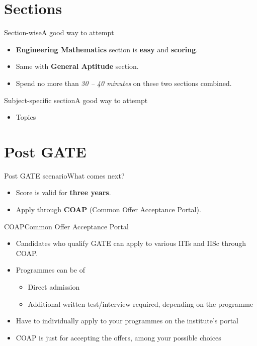 \documentclass[handout]{beamer}
\begin{document}
\section{Sections}
\begin{frame}{Section-wise}{A good way to attempt}
    \begin{itemize}
        \item \textbf{Engineering Mathematics} section is \textbf{easy} and \textbf{scoring}.
        \item Same with \textbf{General Aptitude} section.
        \item Spend no more than \emph{30 -- 40 minutes} on these two sections combined.
    \end{itemize}
\end{frame}

\begin{frame}{Subject-specific section}{A good way to attempt}
    \begin{itemize}
        \item Topics
    \end{itemize}
\end{frame}

\section{Post GATE}
\begin{frame}{Post GATE scenario}{What comes next?}
    \begin{itemize}
        \item Score is valid for \textbf{three years}.
        \item Apply through \textbf{COAP} (Common Offer Acceptance Portal).
    \end{itemize}
\end{frame}

\begin{frame}{COAP}{Common Offer Acceptance Portal}
    \begin{itemize}
        \item Candidates who qualify GATE can apply to various IITs and IISc through COAP.
        \item Programmes can be of
              \begin{itemize}
                  \item Direct admission
                  \item Additional written test/interview required, depending on the programme
              \end{itemize}
        \item Have to individually apply to your programmes on the institute's portal
        \item COAP is just for accepting the offers, among your possible choices
    \end{itemize}
\end{frame}
\end{document}
